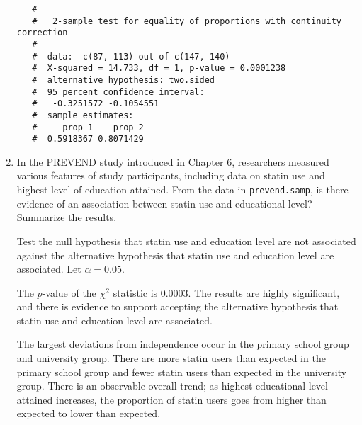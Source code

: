 \documentclass[letterpaper,12pt,twoside,]{pinp}
\begin{document}
\begin{enumerate}
  \begin{ShadedResult}
   \begin{verbatim}
   #  
   #   2-sample test for equality of proportions with continuity correction
   #  
   #  data:  c(87, 113) out of c(147, 140)
   #  X-squared = 14.733, df = 1, p-value = 0.0001238
   #  alternative hypothesis: two.sided
   #  95 percent confidence interval:
   #   -0.3251572 -0.1054551
   #  sample estimates:
   #     prop 1    prop 2 
   #  0.5918367 0.8071429
   \end{verbatim}
   \end{ShadedResult}
\item
  In the PREVEND study introduced in Chapter 6, researchers measured
  various features of study participants, including data on statin use
  and highest level of education attained. From the data in
  \texttt{prevend.samp}, is there evidence of an association between
  statin use and educational level? Summarize the results.

  \color{blue}

  Test the null hypothesis that statin use and education level are not
  associated against the alternative hypothesis that statin use and
  education level are associated. Let \(\alpha = 0.05\).

  The \(p\)-value of the \(\chi^2\) statistic is 0.0003. The results are
  highly significant, and there is evidence to support accepting the
  alternative hypothesis that statin use and education level are
  associated.

  The largest deviations from independence occur in the primary school
  group and university group. There are more statin users than expected
  in the primary school group and fewer statin users than expected in
  the university group. There is an observable overall trend; as highest
  educational level attained increases, the proportion of statin users
  goes from higher than expected to lower than expected.

  \color{black}

\begin{Shaded}
\begin{Highlighting}[]
\NormalTok{(}\NormalTok{)}

\OperatorTok{$}\StringTok{ }\OperatorTok{$} \NormalTok{(}\NormalTok{, }\NormalTok{),}
                          \NormalTok{(}\NormalTok{, }\NormalTok{))}


\end{Highlighting}
\end{Shaded}
\end{enumerate}
\end{document}
